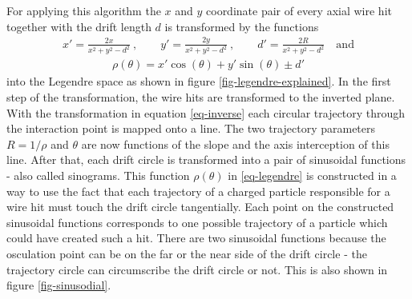 For applying this algorithm the $x$ and $y$ coordinate pair of every axial wire hit together with the drift length $d$ is transformed by the functions
\begin{align} x' = \frac{2x}{x^2 + y^2 - d^2}\ , \qquad y' = \frac{2y}{x^2 + y^2 - d^2}\ ,  \qquad d' = \frac{2R}{x^2 + y^2 - d^2}\quad \text{and} \label{eq-inverse} \end{align}
\begin{align}\rho(\theta) = x' \cos(\theta) + y' \sin(\theta) \pm d' \label{eq-legendre}\end{align}
into the Legendre space as shown in figure \ref{fig-legendre-explained}. In the first step of the transformation, the wire hits are transformed to the inverted plane. With the transformation in equation \ref{eq-inverse} each circular trajectory through the interaction point is mapped onto a line. The two trajectory parameters $R = 1/\rho$ and $\theta$ are now functions of the slope and the axis interception of this line. After that, each drift circle is transformed into a pair of sinusoidal functions - also called sinograms. This function $\rho(\theta)$ in \ref{eq-legendre} is constructed in a way to use the fact that each trajectory of a charged particle responsible for a wire hit must touch the drift circle tangentially. Each point on the constructed sinusoidal functions corresponds to one possible trajectory of a particle which could have created such a hit. There are two sinusoidal functions because the osculation point can be on the far or the near side of the drift circle - the trajectory circle can circumscribe the drift circle or not. This is also shown in figure \ref{fig-sinusodial}.

